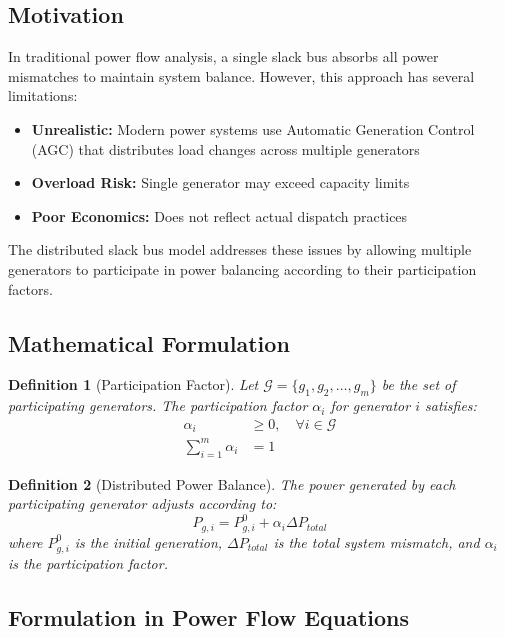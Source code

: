 \documentclass[11pt]{article}
\newtheorem{definition}{Definition}
\begin{document}
\subsection{Motivation}

In traditional power flow analysis, a single slack bus absorbs all power mismatches to maintain system balance. However, this approach has several limitations:

\begin{itemize}
    \item \textbf{Unrealistic:} Modern power systems use Automatic Generation Control (AGC) that distributes load changes across multiple generators
    \item \textbf{Overload Risk:} Single generator may exceed capacity limits
    \item \textbf{Poor Economics:} Does not reflect actual dispatch practices
\end{itemize}

The distributed slack bus model addresses these issues by allowing multiple generators to participate in power balancing according to their participation factors.

\subsection{Mathematical Formulation}

\begin{definition}[Participation Factor]
Let $\mathcal{G} = \{g_1, g_2, \ldots, g_m\}$ be the set of participating generators. The participation factor $\alpha_i$ for generator $i$ satisfies:
\begin{align}
\alpha_i &\geq 0, \quad \forall i \in \mathcal{G} \\
\sum_{i=1}^m \alpha_i &= 1
\end{align}
\end{definition}

\begin{definition}[Distributed Power Balance]
The power generated by each participating generator adjusts according to:
\begin{equation}
P_{g,i} = P_{g,i}^0 + \alpha_i \Delta P_{total}
\label{eq:dist_slack}
\end{equation}
where $P_{g,i}^0$ is the initial generation, $\Delta P_{total}$ is the total system mismatch, and $\alpha_i$ is the participation factor.
\end{definition}

\subsection{Formulation in Power Flow Equations}
\end{document}
